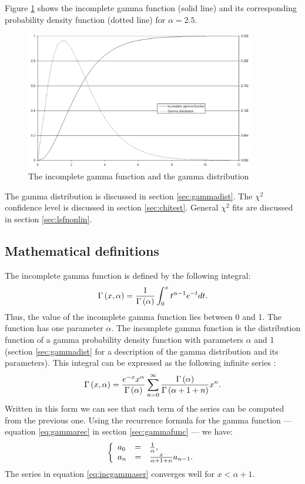 Figure \ref{fig:incGamma} shows the incomplete gamma function
(solid line) and its corresponding probability density function
(dotted line) for $\alpha=2.5$.
\begin{figure}
\centering\includegraphics[width=10cm]{Figures/IncompleteGammaFunction}
\caption{The incomplete gamma function and the gamma distribution}\label{fig:incGamma}
\end{figure}

The gamma distribution is discussed in section
\ref{sec:gammadist}. The $\chi^2$ confidence level is discussed in
section \ref{sec:chitest}. General $\chi^2$ fits are discussed in
section \ref{sec:lsfnonlin}.

\subsection{Mathematical definitions}
\label{sec:incgamma} The incomplete gamma function is defined by
the following integral:
\begin{equation}
  \Gamma\left(x,\alpha\right)={1\over\Gamma\left(\alpha\right)}
  \int_0^x t^{\alpha -1} e^{-t} dt.
\end{equation}
Thus, the value of the incomplete gamma function lies between 0
and 1. The function has one parameter $\alpha$. The incomplete
gamma function is the distribution function of a gamma probability
density function with parameters $\alpha$ and 1 (\cf section
\ref{sec:gammadist} for a description of the gamma distribution
and its parameters). This integral can be expressed as the
following infinite series \cite{AbrSteg}:
\begin{equation}
\label{eq:incgammaser}
  \Gamma\left(x,\alpha\right)={e^{-x}x^\alpha\over\Gamma\left(\alpha\right)}
  \sum_{n=0}^{\infty}{\Gamma\left(\alpha\right) \over
  \Gamma\left(\alpha+1+n\right)}x^n.
\end{equation}
Written in this form we can see that each term of the series can
be computed from the previous one. Using the recurrence formula
for the gamma function --- equation \ref{eq:gammarec} in section
\ref{sec:gammafunc} --- we have:
\begin{equation}
\label{eq:incgammaserterm}
  \left\{{
  \begin{array}{lcl}
    a_0 & = & {1\over\alpha},\\
    a_n & = & {x\over\alpha+1+n}a_{n-1}.
  \end{array}
  }\right.
\end{equation}
The series in equation \ref{eq:incgammaser} converges well for
$x<\alpha+1$.

